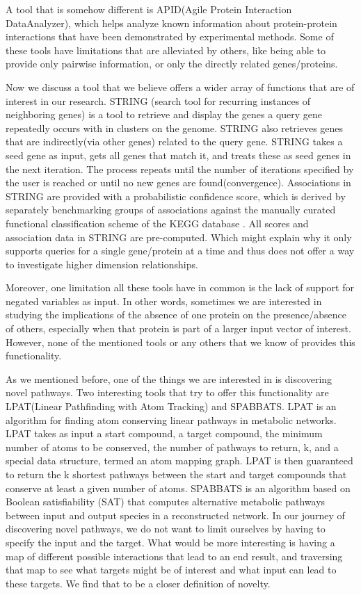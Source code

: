 \documentclass{ucetd}
\begin{document}
A tool that is somehow different is APID(Agile Protein Interaction DataAnalyzer), which helps analyze known information about protein-protein interactions that have been demonstrated by experimental methods.   
Some of these tools have limitations that are alleviated by others, like being able to provide only pairwise information, or only the directly related genes/proteins. 

	Now we discuss a tool that we believe offers a wider array of functions that are of interest in our research. STRING (search tool for recurring instances of neighboring genes) is a tool to retrieve and display the genes a query gene repeatedly occurs with in clusters on the genome\cite{2}. STRING also retrieves genes that are indirectly(via other genes) related to the query gene. STRING takes a seed gene as input, gets all genes that match it, and treats these as seed genes in the next iteration. The process repeats until the number of iterations specified by the user is reached or until no new genes are found(convergence)\cite{2}. Associations in STRING are provided with a probabilistic confidence score, which is derived by separately benchmarking groups of associations against the manually curated functional classification scheme of the KEGG database \cite{46}.
All scores and association data in STRING are pre-computed\cite{3}. Which might explain why it only supports queries for a single gene/protein at a time and thus does not offer a way to investigate higher dimension relationships. 

	Moreover, one limitation all these tools have in common is the lack of support for negated variables as input. In other words, sometimes we are interested in studying the implications of the absence of one protein on the presence/absence of others, especially when that protein is part of a larger input vector of interest. However, none of the mentioned tools or any others that we know of provides this functionality. 

	As we mentioned before, one of the things we are interested in is discovering novel pathways. Two interesting tools that try to offer this functionality are LPAT(Linear Pathfinding with Atom Tracking) and SPABBATS. LPAT is an algorithm for finding atom conserving linear pathways in metabolic networks. LPAT takes as input a start compound, a target compound, the minimum number of atoms to be conserved, the number of pathways to return, k, and a special data structure, termed an atom mapping graph. LPAT is then guaranteed to return the k shortest pathways between the start and target compounds that conserve at least a given number of atoms.
SPABBATS is an algorithm based on Boolean satisfiability (SAT) that computes alternative metabolic pathways between input and output species in a reconstructed network.
In our journey of discovering novel pathways, we do not want to limit ourselves by having to specify the input and the target. What would be more interesting is having a map of different possible interactions that lead to an end result, and traversing that map to see what targets might be of interest and what input can lead to these targets. We find that to be a closer definition of novelty. 
\end{document}
